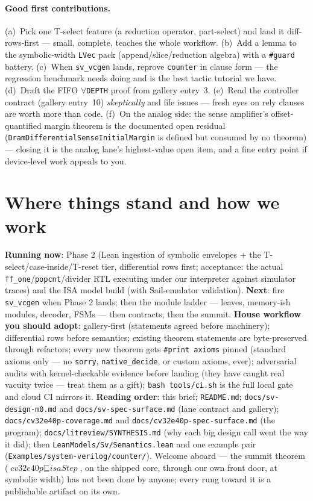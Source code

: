 \documentclass[10pt]{article}
\newcommand{\code}[1]{\texttt{#1}}
\begin{document}
\paragraph{Good first contributions.} (a)~Pick one T-select feature (a reduction
operator, part-select) and land it diff-rows-first --- small, complete, teaches the whole
workflow. (b)~Add a lemma to the symbolic-width \code{LVec} pack (append/slice/reduction
algebra) with a \code{\#guard} battery. (c)~When \code{sv\_vcgen} lands, reprove
\code{counter} in clause form --- the regression benchmark needs doing and is the best
tactic tutorial we have. (d)~Draft the FIFO $\forall$\code{DEPTH} proof from gallery
entry~3. (e)~Read the controller contract (gallery entry~10) \emph{skeptically} and file issues
--- fresh eyes on rely clauses are worth more than code. (f)~On the analog side: the
sense amplifier's offset-quantified margin theorem is the documented open residual
(\code{DramDifferentialSenseInitialMargin} is defined but consumed by no theorem) ---
closing it is the analog lane's highest-value open item, and a fine entry point if
device-level work appeals to you.

\section{Where things stand and how we work}
\textbf{Running now}: Phase 2 (Lean ingestion of symbolic envelopes + the
T-select/case-inside/T-reset tier, differential rows first; acceptance: the actual
\code{ff\_one}/\code{popcnt}/divider RTL executing under our interpreter against simulator
traces) and the ISA model build (with Sail-emulator validation). \textbf{Next}: fire
\code{sv\_vcgen} when Phase 2 lands; then the module ladder --- leaves, memory-ish modules,
decoder, FSMs --- then contracts, then the summit. \textbf{House workflow you should adopt}:
gallery-first (statements agreed before machinery); differential rows before semantics;
existing theorem statements are byte-preserved through refactors; every new theorem gets
\code{\#print axioms} pinned (standard axioms only --- no \code{sorry},
\code{native\_decide}, or custom axioms, ever); adversarial audits with kernel-checkable
evidence before landing (they have caught real vacuity twice --- treat them as a gift);
\code{bash tools/ci.sh} is the full local gate and cloud CI mirrors it. \textbf{Reading
order}: this brief; \code{README.md}; \code{docs/sv-design-m0.md} and
\code{docs/sv-spec-surface.md} (lane contract and gallery);
\code{docs/cv32e40p-coverage.md} and \code{docs/cv32e40p-spec-surface.md} (the program);
\code{docs/litreview/SYNTHESIS.md} (why each big design call went the way it did); then
\code{LeanModels/Sv/Semantics.lean} and one example pair
(\code{Examples/system-verilog/counter/}). Welcome aboard --- the summit theorem
($\textit{cv32e40p} \sqsubseteq \textit{isaStep}$, on the shipped core, through our own
front door, at symbolic width) has not been done by anyone; every rung toward it is a
publishable artifact on its own.
\end{document}
